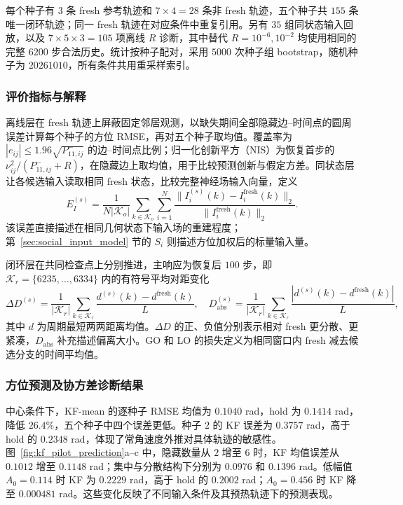 \documentclass[UTF8,fontset=windows,11pt]{ctexart}
\begin{document}
每个种子有 $3$ 条 fresh 参考轨迹和 $7\times4=28$ 条非 fresh 轨迹，五个种子共 $155$ 条唯一闭环轨迹；同一 fresh 轨迹在对应条件中重复引用。另有 $35$ 组同状态输入回放，以及 $7\times5\times3=105$ 项离线 $R$ 诊断，其中替代 $R=10^{-6},10^{-2}$ 均使用相同的完整 $6200$ 步合法历史。统计按种子配对，采用 $5000$ 次种子组 bootstrap，随机种子为 $20261010$，所有条件共用重采样索引。

\subsubsection{评价指标与解释}

离线层在 fresh 轨迹上屏蔽固定邻居观测，以缺失期间全部隐藏边--时间点的圆周误差计算每个种子的方位 RMSE，再对五个种子取均值。覆盖率为 $|e_{ij}|\le1.96\sqrt{P_{11,ij}^{-}}$ 的边--时间点比例；归一化创新平方（NIS）为恢复首步的 $\nu_{ij}^2/(P_{11,ij}^{-}+R)$，在隐藏边上取均值，用于比较预测创新与假定方差。同状态层让各候选输入读取相同 fresh 状态，比较完整神经场输入向量，定义
\begin{equation}
 E_I^{(s)}=\frac{1}{N|\mathcal K_o|}
 \sum_{k\in\mathcal K_o}\sum_{i=1}^N
 \frac{\|I_i^{(s)}(k)-I_i^{\mathrm{fresh}}(k)\|_2}
 {\|I_i^{\mathrm{fresh}}(k)\|_2}.
 \label{eq:pilot_input_error}
\end{equation}
该误差直接描述在相同几何状态下输入场的重建程度；第~\ref{sec:social_input_model} 节的 $S_i$ 则描述方位加权后的标量输入量。

闭环层在共同检查点上分别推进，主响应为恢复后 $100$ 步，即 $\mathcal K_r=\{6235,\ldots,6334\}$ 内的有符号平均对距变化
\begin{equation}
 \Delta D^{(s)}=\frac{1}{|\mathcal K_r|}\sum_{k\in\mathcal K_r}
 \frac{d^{(s)}(k)-d^{\mathrm{fresh}}(k)}{L},
 \quad
 D_{\mathrm{abs}}^{(s)}=\frac{1}{|\mathcal K_r|}\sum_{k\in\mathcal K_r}
 \frac{|d^{(s)}(k)-d^{\mathrm{fresh}}(k)|}{L},
 \label{eq:pilot_distance_metrics}
\end{equation}
其中 $d$ 为周期最短两两距离均值。$\Delta D$ 的正、负值分别表示相对 fresh 更分散、更紧凑，$D_{\mathrm{abs}}$ 补充描述偏离大小。GO 和 LO 的损失定义为相同窗口内 fresh 减去候选分支的时间平均值。

\subsubsection{方位预测及协方差诊断结果}

中心条件下，KF-mean 的逐种子 RMSE 均值为 $0.1040$ rad，hold 为 $0.1414$ rad，降低 $26.4\%$，五个种子中四个误差更低。种子 $2$ 的 KF 误差为 $0.3757$ rad，高于 hold 的 $0.2348$ rad，体现了常角速度外推对具体轨迹的敏感性。图~\ref{fig:kf_pilot_prediction}a--c 中，隐藏数量从 $2$ 增至 $6$ 时，KF 均值误差从 $0.1012$ 增至 $0.1148$ rad；集中与分散结构下分别为 $0.0976$ 和 $0.1396$ rad。低幅值 $A_0=0.114$ 时 KF 为 $0.2229$ rad，高于 hold 的 $0.2002$ rad；$A_0=0.456$ 时 KF 降至 $0.000481$ rad。这些变化反映了不同输入条件及其预热轨迹下的预测表现。
\end{document}
